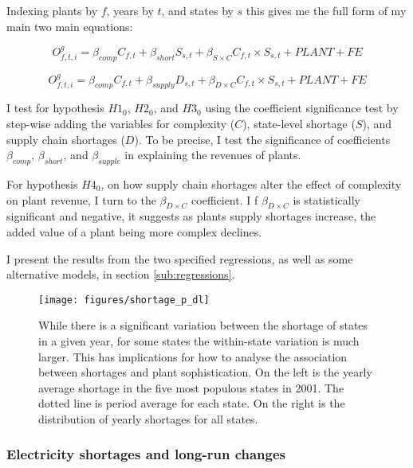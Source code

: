 \documentclass[11pt]{article}
\begin{document}
Indexing plants by $f$, years by $t$, and states by $s$ this gives me the full form of my main two main equations:

\begin{equation}
\label{eqn:int_shortages}
O^{g}_{f,t,i} = \beta_{comp} C_{f,t} + \beta_{short} S_{s,t} + \beta_{S\times C} C_{f,t} \times S_{s,t} + PLANT + FE
\end{equation}

\begin{equation}
\label{eqn:int_supply}
O^{g}_{f,t,i} = \beta_{comp} C_{f,t} + \beta_{supply} D_{s,t} + \beta_{D\times C} C_{f,t} \times S_{s,t} + PLANT + FE
\end{equation}

I test for hypothesis $H1_0$, $H2_0$, and $H3_0$ using the coefficient significance test by step-wise adding the variables for complexity ($C$), state-level shortage ($S$), and supply chain shortages ($D$). To be precise, I test the significance of coefficients $\beta_{comp}$, $\beta_{short}$, and $\beta_{supple}$ in explaining the revenues of plants.

For hypothesis $H4_0$, on how supply chain shortages alter the effect of complexity on plant revenue, I turn to the $\beta_{D \times C}$ coefficient. I f $\beta_{D \times C}$ is statistically significant and negative, it suggests as plants supply shortages increase, the added value of a plant being more complex declines. 

I present the results from the two specified regressions, as well as some alternative models, in section \ref{sub:regressions}.

\begin{figure}[htpb]
	\centering
	\label{fig:shortage_p_dl}
	\texttt{[image: figures/shortage\_p\_dl]}
	\caption{While there is a significant variation between the shortage of states in a given year, for some states the within-state variation is much larger. This has implications for how to analyse the association between shortages and plant sophistication. On the left is the yearly average shortage in the five most populous states in 2001. The dotted line is period average for each state. On the right is the distribution of yearly shortages for all states.}%
	\label{fig:shortage_dist}
\end{figure}

\subsubsection{Electricity shortages and long-run changes}\label{sub:entry_emp_strat}
\end{document}
